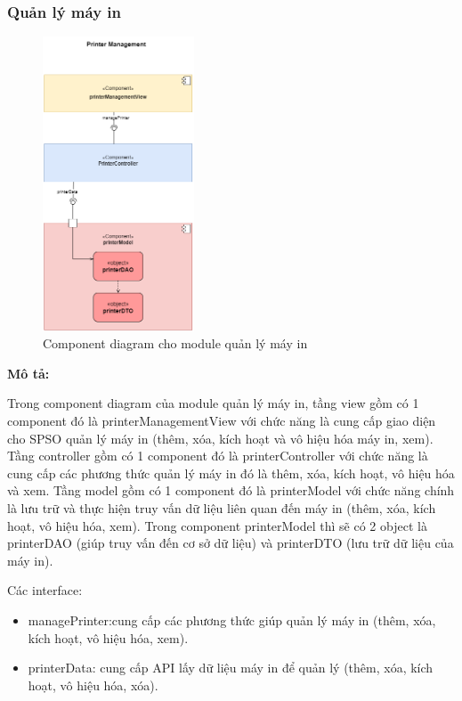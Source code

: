 \subsubsection{Quản lý máy in}
\begin{figure}[H]
    \begin{center}
        \includegraphics[width=0.4\textwidth]{Images/Architecture Design/PM_Component.png}
        \caption{Component diagram cho module quản lý máy in}
        \label{fig:arch}
    \end{center}
\end{figure}
\textbf{Mô tả:}\par
Trong component diagram của module quản lý máy in, tầng view gồm có 1 component đó là printerManagementView với chức năng là cung cấp giao diện cho SPSO quản lý máy in (thêm, xóa, kích hoạt và vô hiệu hóa máy in, xem). Tầng controller gồm có 1 component đó là printerController với chức năng là cung cấp các phương thức quản lý máy in đó là thêm, xóa, kích hoạt, vô hiệu hóa và xem. Tầng model gồm có 1 component đó là printerModel với chức năng chính là lưu trữ và thực hiện truy vấn dữ liệu liên quan đến máy in (thêm, xóa, kích hoạt, vô hiệu hóa, xem). Trong component printerModel thì sẽ có 2 object là printerDAO (giúp truy vấn đến cơ sở dữ liệu) và printerDTO (lưu trữ dữ liệu của máy in).\par
Các interface: 
\begin{itemize}
    \item managePrinter:cung cấp các phương thức giúp quản lý máy in (thêm, xóa, kích hoạt, vô hiệu hóa, xem).
    \item printerData: cung cấp API lấy dữ liệu máy in để quản lý (thêm, xóa, kích hoạt, vô hiệu hóa, xóa).
    
\end{itemize}



